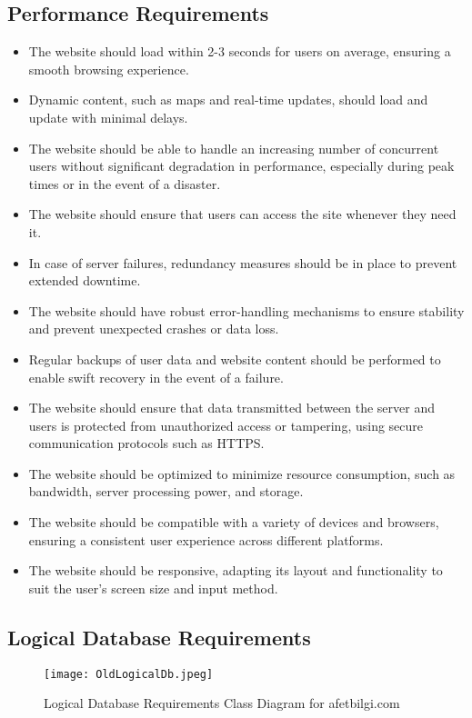\documentclass[11pt,a4paper]{article}
\begin{document}
\subsection{Performance Requirements}
\begin{itemize}
    \item The website should load within 2-3 seconds for users on average, ensuring a smooth browsing experience.
    \item Dynamic content, such as maps and real-time updates, should load and update with minimal delays.
    \item The website should be able to handle an increasing number of concurrent users without significant degradation in performance, especially during peak times or in the event of a disaster.
    \item The website should ensure that users can access the site whenever they need it.
    \item In case of server failures, redundancy measures should be in place to prevent extended downtime.
    \item The website should have robust error-handling mechanisms to ensure stability and prevent unexpected crashes or data loss.
    \item Regular backups of user data and website content should be performed to enable swift recovery in the event of a failure.
    \item The website should ensure that data transmitted between the server and users is protected from unauthorized access or tampering, using secure communication protocols such as HTTPS.
    \item The website should be optimized to minimize resource consumption, such as bandwidth, server processing power, and storage.
    \item The website should be compatible with a variety of devices and browsers, ensuring a consistent user experience across different platforms.
    \item The website should be responsive, adapting its layout and functionality to suit the user's screen size and input method.
\end{itemize}

\newpage

\subsection{Logical Database Requirements}

\begin{figure}[H]
    \centering
    \texttt{[image: OldLogicalDb.jpeg]}
    \caption{Logical Database Requirements Class Diagram for afetbilgi.com}
    \label{Logical Database Requirements Class Diagram for afetbilgi.com}
\end{figure}
\end{document}
